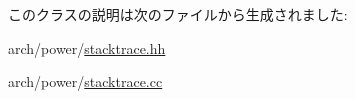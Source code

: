 このクラスの説明は次のファイルから生成されました:\begin{DoxyCompactItemize}
\item 
arch/power/\hyperlink{power_2stacktrace_8hh}{stacktrace.hh}\item 
arch/power/\hyperlink{power_2stacktrace_8cc}{stacktrace.cc}\end{DoxyCompactItemize}
